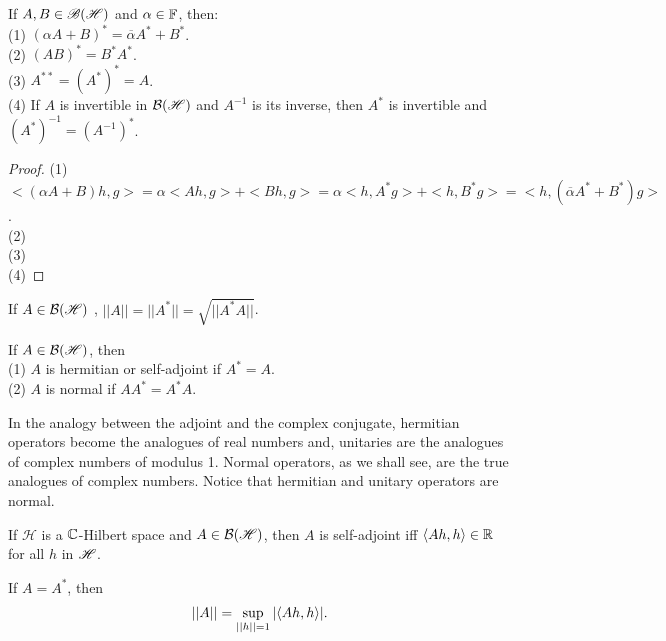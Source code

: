 \begin{proposition}{}{}
    If $A,B\in \mathscr{B}(\mathcal{\mathscr{H}})$ and $\alpha\in\mathbb{F}$, then:\\
    (1) $(\alpha A+B)^*=\overline{\alpha}A^*+B^*$.\\
    (2) $(AB)^*=B^*A^*$.\\
    (3) $A^{**}=(A^*)^*=A$.\\
    (4) If $A$ is invertible in $\mathcal{B}(\mathscr{H})$ and $A^{-1}$ is its inverse, then $A^*$ is invertible and $(A^*)^{-1} = (A^{-1})^*$.
\end{proposition}
\begin{proof}
    (1) $<(\alpha A+B)h,g>=\alpha <Ah,g> + <Bh,g> = \alpha<h,A^*g> + <h,B^*g>=<h,(\overline{\alpha}A^*+B^*)g>$.
    \\
    (2)\\
(3)\\
(4)
\end{proof}

\begin{proposition}{}{}
    If $A\in \mathcal{B}(\mathscr{H})$ , $||A||=||A^*||=\sqrt{||A^*A||}$.
\end{proposition}

\begin{definition}
    If $A\in \mathcal{B}(\mathscr{H})$, then\\
    (1) $A$ is hermitian or self-adjoint if $A^*=A$.\\
    (2) $A$ is normal if $AA^*=A^*A$.
\end{definition}

In the analogy between the adjoint and the complex conjugate, hermitian 
operators become the analogues of real numbers and, unitaries are 
the analogues of complex numbers of modulus 1. Normal operators, as we 
shall see, are the true analogues of complex numbers. Notice that hermitian 
and unitary operators are normal.

\begin{proposition}{}{}
    If $\mathscr{H}$ is a $\mathbb{C}$-Hilbert space and $A\in \mathcal{B}(\mathscr{H})$, then $A$ is self-adjoint iff
    $\langle Ah,h\rangle\in\mathbb{R}$ for all $h$ in $\mathscr{H}$. 
\end{proposition}

\begin{proposition}{}{}
    If $A=A^*$, then 
    \begin{align*}
        ||A||=\sup_{||h||=1}|\langle Ah,h\rangle|. 
    \end{align*}
\end{proposition}

